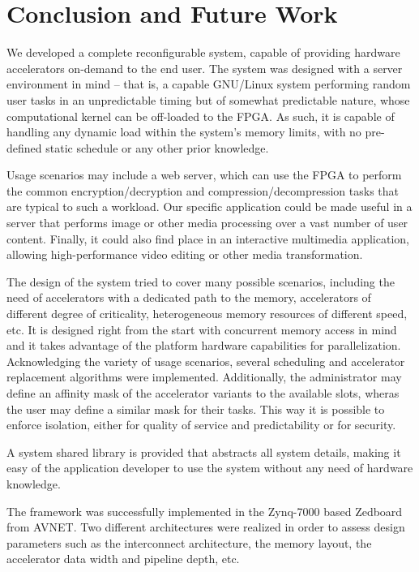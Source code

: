 \chapter{Conclusion and Future Work}

We developed a complete reconfigurable system, capable of providing hardware accelerators on-demand to the end user.
The system was designed with a server environment in mind -- that is, a capable GNU/Linux system performing
random user tasks in an unpredictable timing but of somewhat predictable nature, whose computational kernel
can be off-loaded to the FPGA. As such, it is capable of handling any dynamic load within the system's memory limits,
with no pre-defined static schedule or any other prior knowledge.

Usage scenarios may include a web server, which can use the FPGA to perform the common encryption/decryption and
compression/decompression tasks that are typical to such a workload. Our specific application could be made useful
in a server that performs image or other media processing over a vast number of user content. Finally, it could
also find place in an interactive multimedia application,
allowing high-performance video editing or other media transformation.

The design of the system tried to cover many possible scenarios, including the need of accelerators with
a dedicated path to the memory, accelerators of different degree of criticality,
heterogeneous memory resources of different speed, etc.
It is designed right from the start with concurrent memory access in mind and it takes advantage of the
platform hardware capabilities for parallelization. Acknowledging the variety of usage scenarios, several
scheduling and accelerator replacement algorithms were implemented.
Additionally, the administrator may define an affinity mask of the accelerator variants to the available slots,
wheras the user may define a similar mask for their tasks. This way it is possible to enforce isolation,
either for quality of service and predictability or for security.

A system shared library is provided that abstracts all system details, making it easy of the application
developer to use the system without any need of hardware knowledge.

The framework was successfully implemented in the Zynq-7000 based Zedboard from AVNET.
Two different architectures were realized in order to assess design parameters such as the
interconnect architecture, the memory layout, the accelerator data width and pipeline depth, etc.

